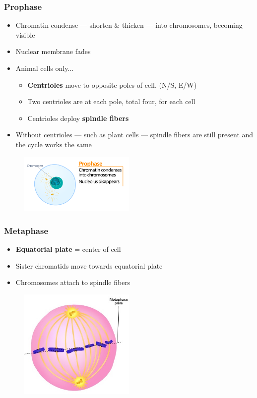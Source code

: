 \documentclass[a4paper,12pt]{article}
\begin{document}
\subsubsection{Prophase}
\begin{itemize}
    \item{Chromatin condense --- shorten \& thicken --- into chromosomes, becoming visible}
    \item{Nuclear membrane fades}
    \item{
            Animal cells only...
            \begin{itemize}
                \item{\textbf{Centrioles} move to opposite poles of cell. (N/S, E/W)}
                \item{Two centrioles are at each pole, total four, for each cell}
                \item{Centrioles deploy \textbf{spindle fibers}}
            \end{itemize}
        }
    \item{Without centrioles --- such as plant cells --- spindle fibers are still present and the cycle works the same}
\end{itemize}

\begin{figure}[H]
    \centering
    \includegraphics[width=0.5\textwidth]{prophase}
\end{figure}

\subsubsection{Metaphase}
\begin{itemize}
    \item{\textbf{Equatorial plate} = center of cell}
    \item{Sister chromatids move towards equatorial plate}
    \item{Chromosomes attach to spindle fibers}
\end{itemize}

\begin{figure}[H]
    \centering
    \includegraphics[width=0.5\textwidth]{metaphase}
\end{figure}
\end{document}
